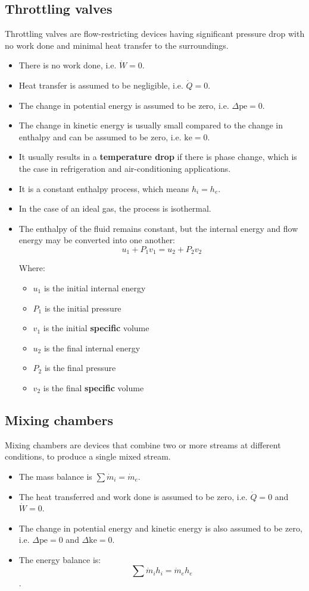 \documentclass[11pt]{article}
\begin{document}
\subsection{Throttling valves}
\label{sec:orgda8ba5f}
Throttling valves are flow-restricting devices having significant pressure drop with no work done and minimal heat transfer to the surroundings.
\begin{itemize}
\item There is no work done, i.e. \(\dot{W} = 0\).
\item Heat transfer is assumed to be negligible, i.e. \(\dot{Q} = 0\).
\item The change in potential energy is assumed to be zero, i.e. \(\Delta \text{pe} = 0\).
\item The change in kinetic energy is usually small compared to the change in enthalpy and can be assumed to be zero, i.e. \(\text{ke} = 0\).
\item It usually results in a \textbf{temperature drop} if there is phase change, which is the case in refrigeration and air-conditioning applications.
\item It is a constant enthalpy process, which means \(h_i = h_e\).
\item In the case of an ideal gas, the process is isothermal.
\item The enthalpy of the fluid remains constant, but the internal energy and flow energy may be converted into one another:
\[u_1 + P_1 v_1 = u_2 + P_2 v_2\]

Where:
\begin{itemize}
\item \(u_1\) is the initial internal energy
\item \(P_1\) is the initial pressure
\item \(v_1\) is the initial \textbf{specific} volume
\item \(u_2\) is the final internal energy
\item \(P_2\) is the final pressure
\item \(v_2\) is the final \textbf{specific} volume
\end{itemize}
\end{itemize}

\newpage

\subsection{Mixing chambers}
\label{sec:orgc3a7aa4}
Mixing chambers are devices that combine two or more streams at different conditions, to produce a single mixed stream.
\begin{itemize}
\item The mass balance is \(\sum \dot{m}_i = \dot{m}_e\).
\item The heat transferred and work done is assumed to be zero, i.e. \(\dot{Q} = 0\) and \(\dot{W} = 0\).
\item The change in potential energy and kinetic energy is also assumed to be zero, i.e. \(\Delta \text{pe} = 0\) and \(\Delta \text{ke} = 0\).
\item The energy balance is:
\[\sum \dot{m}_i h_i = \dot{m}_e h_e\].
\end{itemize}
\end{document}
